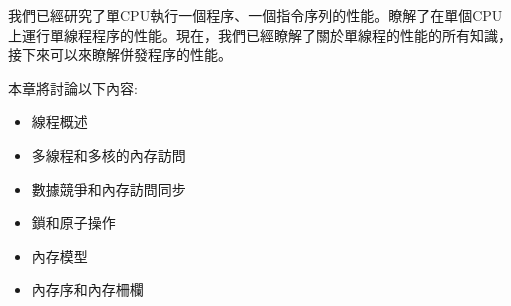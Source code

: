 我們已經研究了單CPU執行一個程序、一個指令序列的性能。瞭解了在單個CPU上運行單線程程序的性能。現在，我們已經瞭解了關於單線程的性能的所有知識，接下來可以來瞭解併發程序的性能。

本章將討論以下內容:

\begin{itemize}
\item 線程概述
\item 多線程和多核的內存訪問
\item 數據競爭和內存訪問同步
\item 鎖和原子操作
\item 內存模型
\item 內存序和內存柵欄
\end{itemize}
